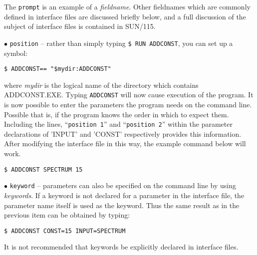 \documentclass[twoside,11pt]{article}
\renewcommand{\_}{{\tt\char'137}}
\newcommand{\xref}[3]{#1}
\begin{document}
The {\tt prompt} is an example of a {\sl fieldname}.
Other fieldnames which are commonly defined in interface files are 
discussed briefly below, 
and a full discussion of 
the subject of interface files is contained in \xref{SUN/115}{sun115}{}.
\begin{description}
\item{$\bullet$ \tt position} -- 
rather than simply typing {\tt \$ RUN ADDCONST}, you can set up a symbol:
\begin{verbatim}
$ ADDCONST== "$mydir:ADDCONST"
\end{verbatim}
where {\sl mydir\/} is the logical name of the directory which contains 
ADDCONST.EXE.
Typing {\tt ADDCONST} will now cause execution of the program.
It is now possible to enter the parameters the program needs on the 
command line.
Possible that is, if the program knows the order in which to expect them.
Including the lines, ``{\tt position 1}'' and ``{\tt position 2}'' within the
parameter declarations of 'INPUT' and 'CONST' respectively  provides this 
information. 
After 	modifying the interface file in this way, the example command 
below will work.
\begin{verbatim}
$ ADDCONST SPECTRUM 15
\end{verbatim}

\item{$\bullet$ \tt keyword} -- parameters can also be specified on 
the command line by using {\sl keywords}.
If a keyword is not declared for a parameter in the interface file,
the parameter name itself is used as the keyword.
Thus the same result as in the previous item can be obtained by typing:
\begin{verbatim}
$ ADDCONST CONST=15 INPUT=SPECTRUM
\end{verbatim}
It is not recommended that keywords be explicitly declared in interface 
files.


\end{description}
\end{document}
